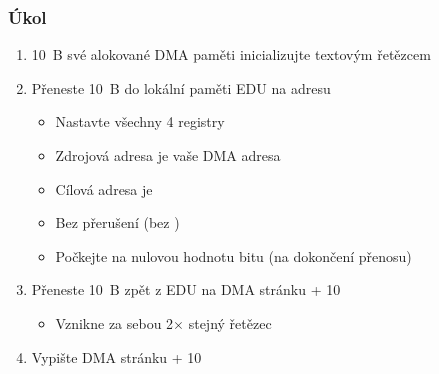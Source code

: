 \begin{frame}
  \frametitle{Úkol}

  \begin{enumerate}
    \item 10~B své alokované DMA paměti inicializujte textovým řetězcem
    \item Přeneste 10~B do lokální paměti EDU na adresu 
    \begin{itemize}
      \item Nastavte všechny 4 registry
      \item Zdrojová adresa je vaše DMA adresa
      \item Cílová adresa je 
      \item Bez přerušení (bez )
      \item Počkejte na nulovou hodnotu bitu  (na dokončení přenosu)
    \end{itemize}

    \item Přeneste 10~B zpět z EDU na DMA stránku + 10
    \begin{itemize}
      \item Vznikne za sebou 2$\times$ stejný řetězec
    \end{itemize}

    \item Vypište DMA stránku + 10
  \end{enumerate}

\end{frame}

\iffimuni

